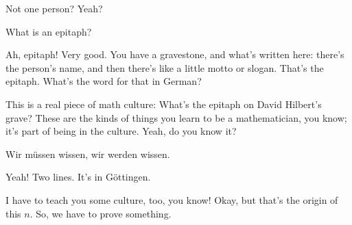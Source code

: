 \begin{speech}[00:49:48 - 00:49:52]
Not one person? Yeah?
\end{speech}

\begin{student}
What is an epitaph?
\end{student}

\begin{speech}[00:49:52 - 00:50:20]
Ah, epitaph! Very good. You have a gravestone,  and what's written here: there's the person's name, and then there's like a little motto or slogan. That's the epitaph. What's the word for that in German?

This is a real piece of math culture: What's the epitaph on David Hilbert's grave? These are the kinds of things you learn to be a mathematician, you know; it's part of being in the culture. Yeah, do you know it?
\end{speech}

\begin{student}
Wir müssen wissen, wir werden wissen.
\end{student}

\begin{speech}[00:50:20 - 00:50:43]
Yeah!  Two lines. It's in Göttingen. 

I have to teach you some culture, too, you know! Okay, but that's the origin of this $n$. So, we have to prove something.
\end{speech}

\begin{content}
\begin{center}
\end{center}
\end{content}

